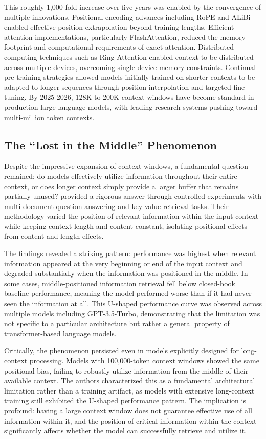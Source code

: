 \documentclass[11pt,letterpaper]{article}
\begin{document}
This roughly 1,000-fold increase over five years was enabled by the convergence of multiple innovations. Positional encoding advances including RoPE and ALiBi enabled effective position extrapolation beyond training lengths. Efficient attention implementations, particularly FlashAttention, reduced the memory footprint and computational requirements of exact attention. Distributed computing techniques such as Ring Attention enabled context to be distributed across multiple devices, overcoming single-device memory constraints. Continual pre-training strategies allowed models initially trained on shorter contexts to be adapted to longer sequences through position interpolation and targeted fine-tuning. By 2025-2026, 128K to 200K context windows have become standard in production large language models, with leading research systems pushing toward multi-million token contexts.

\subsection{The ``Lost in the Middle'' Phenomenon}

Despite the impressive expansion of context windows, a fundamental question remained: do models effectively utilize information throughout their entire context, or does longer context simply provide a larger buffer that remains partially unused? \cite{liu2024lost} provided a rigorous answer through controlled experiments with multi-document question answering and key-value retrieval tasks. Their methodology varied the position of relevant information within the input context while keeping context length and content constant, isolating positional effects from content and length effects.

The findings revealed a striking pattern: performance was highest when relevant information appeared at the very beginning or end of the input context and degraded substantially when the information was positioned in the middle. In some cases, middle-positioned information retrieval fell below closed-book baseline performance, meaning the model performed worse than if it had never seen the information at all. This U-shaped performance curve was observed across multiple models including GPT-3.5-Turbo, demonstrating that the limitation was not specific to a particular architecture but rather a general property of transformer-based language models.

Critically, the phenomenon persisted even in models explicitly designed for long-context processing. Models with 100,000-token context windows showed the same positional bias, failing to robustly utilize information from the middle of their available context. The authors characterized this as a fundamental architectural limitation rather than a training artifact, as models with extensive long-context training still exhibited the U-shaped performance pattern. The implication is profound: having a large context window does not guarantee effective use of all information within it, and the position of critical information within the context significantly affects whether the model can successfully retrieve and utilize it.
\end{document}
